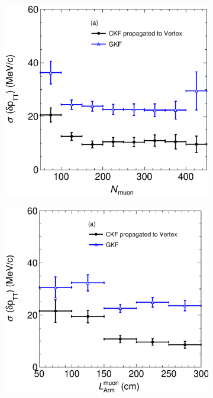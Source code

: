 \begin{figure}[t]
     \centering
     \begin{subfigure}[b]{0.32\textwidth}
         \centering
         \includegraphics[width=\textwidth]{figures/ch6-TKI/2D/deltapTTVSN13.eps}
         \caption{}
         \label{fig:deltapTTVSN13}
     \end{subfigure}
     \begin{subfigure}[b]{0.32\textwidth}
         \centering
         \includegraphics[width=\textwidth]{figures/ch6-TKI/2D/deltapTTVSlArmMC13.eps}

\end{subfigure}
\end{figure}
